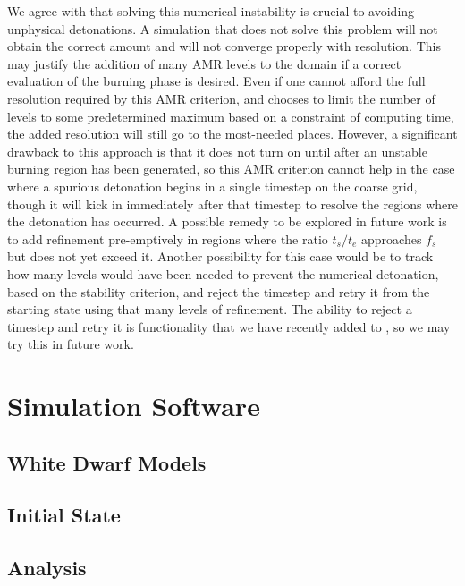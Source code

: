 \documentclass[12pt]{article}
\begin{document}
We agree with \citet{kushnir:2013} that solving this numerical
instability is crucial to avoiding unphysical detonations.
A simulation that does not solve this problem will not obtain
the correct amount and will not converge properly with resolution.
This may justify the addition of many AMR levels to the domain
if a correct evaluation of the burning phase is desired.
Even if one cannot afford the full resolution required by this
AMR criterion, and chooses to limit the number of levels to some
predetermined maximum based on a constraint of computing time,
the added resolution will still go to the most-needed places.
However, a significant drawback to this approach is that it
does not turn on until after an unstable burning region has
been generated, so this AMR criterion cannot help in the case
where a spurious detonation begins in a single timestep on the coarse
grid, though it will kick in immediately after that timestep
to resolve the regions where the detonation has occurred.
A possible remedy to be explored in future work is to add
refinement pre-emptively in regions where the ratio $t_s / t_e$
approaches $f_{s}$ but does not yet exceed it. Another
possibility for this case would be to track how many levels
would have been needed to prevent the numerical detonation,
based on the stability criterion, and reject the timestep and
retry it from the starting state using that many levels of refinement.
The ability to reject a timestep and retry it is functionality that
we have recently added to \castro, so we may try this in future work.



\newpage
\section{Simulation Software}
\label{sec:software}

\subsection{White Dwarf Models}
\label{sec:initial_models}

\subsection{Initial State}
\label{sec:initial_state}

\subsection{Analysis}
\label{sec:analysis}
\end{document}
